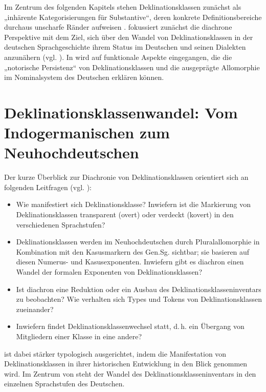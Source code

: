 Im Zentrum des folgenden Kapitels stehen Deklinationsklassen zunächst als „inhärente Kategorisierungen für Substantive“, deren konkrete Definitionsbereiche durchaus unscharfe Ränder aufweisen \citep[23]{Kürschner2008a}.  fokussiert zunächst die diachrone Perspektive mit dem Ziel, sich über den Wandel von Deklinationsklassen in der deutschen Sprachgeschichte ihrem Status im Deutschen und seinen Dialekten anzunähern (vgl. \citealt[89]{Wurzel1986}). In  wird auf funktionale Aspekte eingegangen, die die „notorische Persistenz“ \citep[282]{Nübling2008} von Deklinationsklassen und die ausgeprägte Allomorphie im Nominalsystem des Deutschen erklären können.

\section[Deklinationsklassenwandel]{Deklinationsklassenwandel: Vom Indogermanischen zum Neuhochdeutschen}\label{sec:3.1}
Der kurze Überblick zur Diachronie von Deklinationsklassen orientiert sich an folgenden Leitfragen (vgl. \citealt[294--295]{Nübling2008}):

\begin{itemize}
\item Wie manifestiert sich Deklinationsklasse? Inwiefern ist die Markierung von Deklinationsklassen transparent (overt) oder verdeckt (kovert) in den verschiedenen Sprachstufen?
\item Deklinationsklassen werden im Neuhochdeutschen durch Pluralallomorphie in Kombination mit den Kasusmarkern des Gen.Sg. sichtbar; sie basieren auf diesen Numerus- und Kasusexponenten. Inwiefern gibt es diachron einen Wandel der formalen Exponenten von Deklinationsklassen?
\item Ist diachron eine Reduktion oder ein Ausbau des Deklinationsklasseninventars zu beobachten? Wie verhalten sich Types und Tokens von Deklinationsklassen zueinander?
\item Inwiefern findet Deklinationsklassenwechsel statt, d.\,h. ein Übergang von Mitgliedern einer Klasse in eine andere?
\end{itemize}

 ist dabei stärker typologisch ausgerichtet, indem die Manifestation von Deklinationsklassen in ihrer historischen Entwicklung in den Blick genommen wird. Im Zentrum von  steht der Wandel des Deklinationsklasseninventars in den einzelnen Sprachstufen des Deutschen.

